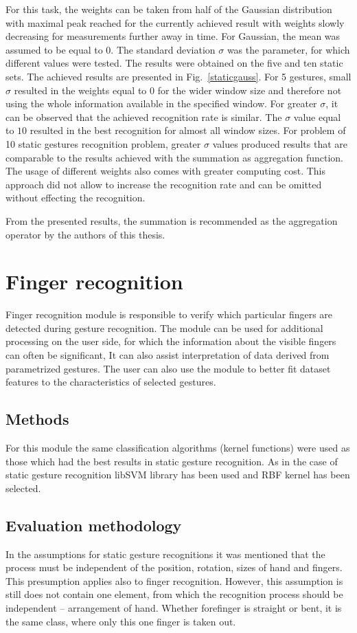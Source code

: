 For this task, the weights can be taken from half of the Gaussian distribution with maximal peak reached for the currently achieved result with weights slowly decreasing for measurements further away in time.
For Gaussian, the mean was assumed to be equal to $0$.
The standard deviation $\sigma$ was the parameter, for which different values were tested.
The results were obtained on the five and ten static sets.
The achieved results are presented in Fig.~\ref{staticgauss}.
For 5 gestures, small $\sigma$ resulted in the weights equal to $0$ for the wider window size and therefore not using the whole information available in the specified window. 
For greater $\sigma$, it can be observed that the achieved recognition rate is similar.
The $\sigma$ value equal to $10$ resulted in the best recognition for almost all window sizes.
For problem of 10 static gestures recognition problem, greater $\sigma$ values produced results that are comparable to the results achieved with the summation as aggregation function.
The usage of different weights also comes with greater computing cost.
This approach did not allow to increase the recognition rate and can be omitted without effecting the recognition.

From the presented results, the summation is recommended as the aggregation operator by the authors of this thesis.


\section{Finger recognition} 
Finger recognition module is responsible to verify which particular fingers are detected during gesture recognition. The module can be used for additional processing on the user side, for which the information about the visible fingers can often be significant, It can also assist interpretation of data derived from parametrized gestures. The user can also use the module to better fit dataset features to the characteristics of selected gestures.
\subsection{Methods}
For this module the same classification algorithms (kernel functions) were used as those which had the best results in static gesture recognition. As in the case of static gesture recognition libSVM library has been used and RBF kernel has been selected.
\subsection{Evaluation methodology}
In the assumptions for static gesture recognitions it was mentioned that the process must be independent of the position, rotation, sizes of hand and fingers. This presumption applies also to finger recognition. However, this assumption is still does not contain one element, from which the recognition process should be independent -- arrangement of hand. Whether forefinger is straight or bent, it is the same class, where only this one finger is taken out.


